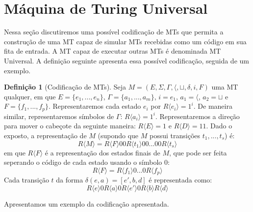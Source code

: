 \documentclass[a4paper]{article}
\theoremstyle{definition}
\newtheorem{Definition}{Definição}
\begin{document}
  \section{Máquina de Turing Universal}

  Nessa seção discutiremos uma possível codificação de MTs que permita a
  construção de uma MT capaz de simular MTs recebidas como um código em sua fita
  de entrada. A MT capaz de executar outras MTs é denominada MT Universal. A
  definição seguinte apresenta essa possível codificação, seguida de um exemplo.

  \begin{Definition}[Codificação de MTs]
    Seja $M = (E,\Sigma,\Gamma,\langle, \sqcup, \delta,i,F)$ uma MT qualquer, em
    que $E = \{e_1,...,e_n\}$, $\Gamma = \{a_1,...,a_m\}$, $i = e_1$, $a_1 =
    \langle$, $a_2 = \sqcup$ e $F = \{f_1,...,f_p\}$. Representaremos cada
    estado $e_i$ por $R\langle e_i \rangle = 1^i$. De maneira similar,
    representaremos símbolos de $\Gamma$: $R\langle a_i \rangle = 1^i$.
    Representaremos a direção para mover o cabeçote da seguinte maneira:
    $R\langle E \rangle = 1$ e $R\langle D \rangle = 11$. Dado o exposto,
    a representação de $M$ (supondo que $M$ possui transições $t_1, ...,t_s$) é:
    \[
      R\langle M \rangle = R\langle F \rangle 00 R\langle
      t_1 \rangle 00 ... 00 R\langle  t_s \rangle
    \]
    em que $R\langle F \rangle$ é a representação dos estados finais de $M$, que
    pode ser feita seperando o código de cada estado usando o símbolo 0:
    \[
      R\langle F \rangle = R\langle f_1 \rangle 0 ... 0 R\langle f_p \rangle
    \]
    Cada transição $t$ da forma $\delta(e,a)=[e',b,d]$ é representada como:
    \[
      R\langle e \rangle 0 R\langle a \rangle 0 R\langle e' \rangle 0 R\langle b
      \rangle R\langle d \rangle
    \]
  \end{Definition}

  Apresentamos um exemplo da codificação apresentada.
\end{document}
